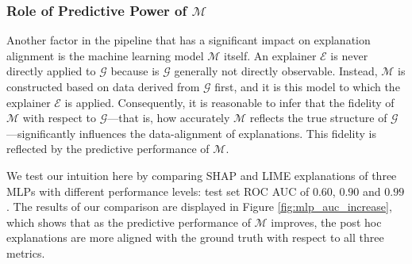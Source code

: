 \documentclass[12pt]{article}  %
\newcommand{\mM}{\mathcal{M}}
\begin{document}
  \subsubsection{Role of Predictive Power of $\mathcal{M}$}
    \label{sec:role_of_predictive_power}
      Another factor in the pipeline that has a significant impact on  explanation alignment is the machine learning model $\mathcal{M}$ itself. 
      An explainer $\mathcal{E}$ is never directly applied to $\mathcal{G}$ because is $\mathcal{G}$ generally not directly observable. Instead, $\mathcal{M}$ is constructed based on data derived from $\mathcal{G}$ first, and it is this model to which the explainer $\mathcal{E}$ is applied. Consequently, it is reasonable to infer that the fidelity of $\mathcal{M}$ with respect to $\mathcal{G}$—that is, how accurately $\mathcal{M}$ reflects the true structure of $\mathcal{G}$—significantly influences the data-alignment of explanations. This fidelity is reflected by the predictive performance of $\mM$. 
      
      We test our intuition here by comparing SHAP and LIME explanations of three MLPs with different performance levels: test set ROC AUC of $0.60$, $0.90$ and $0.99$. %
      The results of our comparison are displayed in Figure \ref{fig:mlp_auc_increase}, which shows that as the predictive performance of $\mM$ improves, the post hoc explanations are more aligned with the ground truth with respect to all three metrics. %
      
\end{document}
